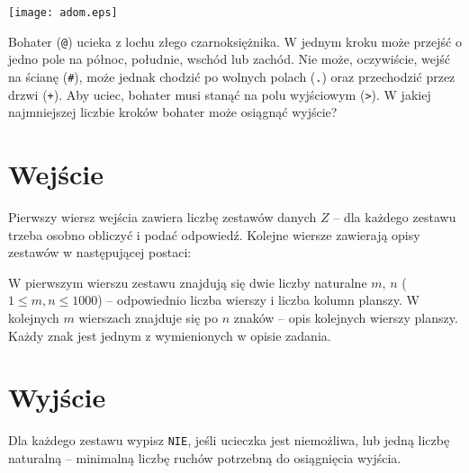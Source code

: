 \documentclass{spiral-kurs}
\begin{document}
\makeheader
%

\begin{center}
\texttt{[image: adom.eps]}
\end{center}


Bohater (\texttt{@}) ucieka z lochu złego czarnoksiężnika. W jednym kroku może przejść o jedno pole na północ, południe, wschód lub zachód. Nie może, oczywiście, wejść na ścianę (\texttt{\#}), może jednak chodzić po wolnych polach (\texttt{.}) oraz przechodzić przez drzwi (\texttt{+}).
Aby uciec, bohater musi stanąć na polu wyjściowym  (\texttt{>}). W jakiej najmniejszej liczbie kroków bohater może osiągnąć wyjście?

    \section{Wejście}

Pierwszy wiersz wejścia zawiera liczbę zestawów danych $Z$ -- dla każdego zestawu trzeba osobno obliczyć i podać odpowiedź. Kolejne wiersze zawierają opisy zestawów w następującej postaci:

W pierwszym wierszu zestawu znajdują się dwie liczby naturalne $m$, $n$ ($1 \leq m, n \leq 1000$) -- odpowiednio liczba wierszy i liczba kolumn planszy. W kolejnych $m$ wierszach znajduje się po $n$ znaków -- opis kolejnych wierszy planszy. Każdy znak jest jednym z wymienionych w opisie zadania.

    \section{Wyjście}

Dla każdego zestawu wypisz \texttt{NIE}, jeśli ucieczka jest niemożliwa, lub jedną liczbę naturalną -- minimalną liczbę ruchów potrzebną do osiągnięcia wyjścia.


  
\end{document}
